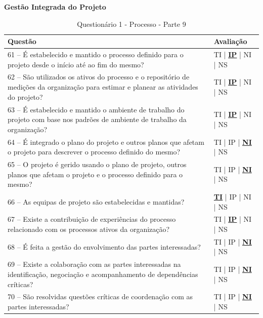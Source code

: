 \documentclass[openany,10pt,a4paper]{article}
\begin{document}
\begin{appendix}
	\begin{table}[h]
	\textbf{Gestão Integrada do Projeto}
		\centering
		\caption{Questionário 1 - Processo - Parte 9}
		\begin{tabular}{p{5in}p{1in}}		
			\toprule
			\textbf{Questão}  & \textbf{Avaliação}\\ 
			\midrule
			61 – É estabelecido e mantido o processo definido para o projeto desde o início até ao fim do mesmo?
	 & TI | \underline{\textbf{IP}} | NI | NS \\
			\midrule
			62 – São utilizados os ativos do processo e o repositório de medições da organização para 
	estimar e planear as atividades do projeto?
	 & TI | \underline{\textbf{IP}} | NI | NS \\
			\midrule
			63 – É estabelecido e mantido o ambiente de trabalho do projeto com base nos padrões de 
	ambiente de trabalho da organização?
	 & TI | \underline{\textbf{IP}} | NI | NS \\
			\midrule
			64 – É integrado o plano do projeto e outros planos que afetam o projeto para descrever o 
	processo definido do mesmo?
	 & TI | IP | \underline{\textbf{NI}} | NS \\
			\midrule
			65 – O projeto é gerido usando o plano de projeto, outros planos que afetam o projeto e o 
	processo definido para o mesmo?
	  & TI | IP | \underline{\textbf{NI}} | NS \\
			\midrule
			66 – As equipas de projeto são estabelecidas e mantidas?
	 & \underline{\textbf{TI}} | IP | NI | NS \\
			\midrule
			67 – Existe a contribuição de experiências do processo relacionado com os processos ativos da 
	organização?
	 & TI | \underline{\textbf{IP}} | NI | NS \\
			\midrule
			68 – É feita a gestão do envolvimento das partes interessadas?
	 & TI | IP | \underline{\textbf{NI}} | NS \\
			\midrule
			69  – Existe a colaboração com as partes interessadas na identificação, negociação e 
	acompanhamento de dependências críticas?
	 & TI | IP | \underline{\textbf{NI}} | NS \\
			\midrule
			70 – São resolvidas questões críticas de coordenação com as partes interessadas?
	 & TI | IP | \underline{\textbf{NI}} | NS \\
			\bottomrule
		\end{tabular} 
	\end{table}
	

\end{appendix}
\end{document}
